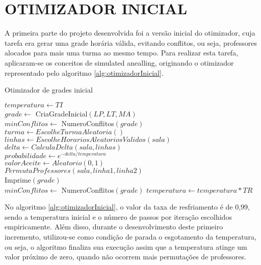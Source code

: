 \section{OTIMIZADOR INICIAL}

A primeira parte do projeto desenvolvida foi a versão inicial do otimizador, cuja tarefa era gerar uma grade horária válida, evitando conflitos, ou seja, professores alocados para mais uma turma ao mesmo tempo. Para realizar esta tarefa, aplicaram-se os conceitos de simulated anealling, originando o otimizador representado pelo algoritmo \ref{alg:otimizadorInicial}.

\begin{algorithm}
	\caption{Otimizador de grades inicial}
	\label{alg:otimizadorInicial}
	$temperatura \leftarrow TI$\\
	$grade \leftarrow$ CriaGradeInicial$(LP, LT, MA)$\\
	$minConflitos \leftarrow$ NumeroConflitos$(grade)$\\
	 {
		 {
			$turma \leftarrow EscolheTurmaAleatoria()$\\
			$linhas \leftarrow EscolheHorariosAleatoriosValidos(sala)$\\
			$delta \leftarrow CalculaDelta(sala, linhas)$\\
			$probabilidade \leftarrow e^{-delta/temperatura}$\\
			$valorAceite \leftarrow Aleatorio(0, 1)$\\
			 {
				$PermutaProfessores(sala, linha1, linha2)$\\
				 {
					Imprime$(grade)$\\
					$minConflitos \leftarrow$ NumeroConflitos$(grade)$
				}
			}
		}
		$temperatura \leftarrow temperatura * TR$
	}
\end{algorithm}

No algoritmo \ref{alg:otimizadorInicial}, o valor da taxa de resfriamento é de 0,99, sendo a temperatura inicial e o número de passos por iteração escolhidos empiricamente. Além disso, durante o desenvolvimento deste primeiro incremento, utilizou-se como condição de parada o esgotamento da temperatura, ou seja, o algoritmo finaliza sua execução assim que a temperatura atinge um valor próximo de zero, quando não ocorrem mais permutações de professores.

